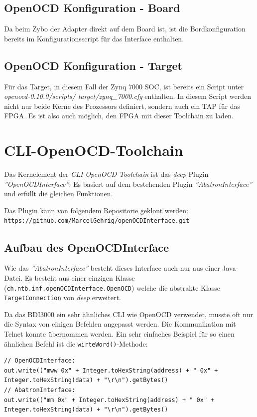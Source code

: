 \subsection{OpenOCD Konfiguration - Board}
Da beim Zybo der Adapter direkt auf dem Board ist, ist die Bordkonfiguration bereits im Konfigurationsscript für das Interface enthalten.

\subsection{OpenOCD Konfiguration - Target}
Für das Target, in diesem Fall der Zynq 7000 SOC, ist bereits ein Script unter \textit{openocd-0.10.0/scripts/ target/zynq\_7000.cfg} enthalten.
In diesem Script werden nicht nur beide Kerne des Prozessors definiert, sondern auch ein TAP für das FPGA.
Es ist also auch möglich, den FPGA mit dieser Toolchain zu laden.


\section{CLI-OpenOCD-Toolchain}
\label{section:CLI-OpenOCD-Toolchain}
Das Kernelement der \textit{CLI-OpenOCD-Toolchain} ist das \textit{deep}-Plugin \textit{''OpenOCDInterface''}.
Es basiert auf dem bestehenden Plugin \textit{''AbatronInterface''} und erfüllt die gleichen Funktionen.

Das Plugin kann von folgendem Repositorie geklont werden:\\
\texttt{https://github.com/MarcelGehrig/openOCDInterface.git}


\subsection{Aufbau des OpenOCDInterface}
Wie das \textit{''AbatronInterface''} besteht dieses Interface auch nur aus einer Java-Datei.
Es besteht aus einer einzigen Klasse (\texttt{ch.ntb.inf.openOCDInterface.OpenOCD}) welche die abstrakte Klasse \texttt{TargetConnection} von \textit{deep} erweitert.

Da das BDI3000 ein sehr ähnliches CLI wie OpenOCD verwendet, musste oft nur die Syntax von einigen Befehlen angepasst werden.
Die Kommunikation mit Telnet konnte übernommen werden.
Ein sehr einfaches Beispiel für so einen ähnlichen Befehl ist die \texttt{wirteWord()}-Methode:

\lstset{language=java}
\begin{lstlisting}
// OpenOCDInterface:
out.write(("mww 0x" + Integer.toHexString(address) + " 0x" + Integer.toHexString(data) + "\r\n").getBytes()
// AbatronInterface:
out.write(("mm 0x" + Integer.toHexString(address) + " 0x" + Integer.toHexString(data) + "\r\n").getBytes()
\end{lstlisting}

